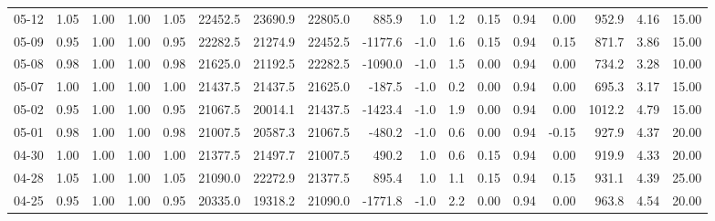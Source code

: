 \begin{threeparttable}
{\begin{tabular}{lrrrrrrrrrrrrrrrr}
  05-12 &         1.05 &           1.00 &          1.00 &          1.05 & 22452.5 & 23690.9 & 22805.0 &      885.9 &                      1.0 &                 1.2 &       0.15 &      0.94 &           0.00 &            952.9 &            4.16 &                  15.00 \\
  05-09 &         0.95 &           1.00 &          1.00 &          0.95 & 22282.5 & 21274.9 & 22452.5 &    -1177.6 &                     -1.0 &                 1.6 &       0.15 &      0.94 &           0.15 &            871.7 &            3.86 &                  15.00 \\
  05-08 &         0.98 &           1.00 &          1.00 &          0.98 & 21625.0 & 21192.5 & 22282.5 &    -1090.0 &                     -1.0 &                 1.5 &       0.00 &      0.94 &           0.00 &            734.2 &            3.28 &                  10.00 \\
  05-07 &         1.00 &           1.00 &          1.00 &          1.00 & 21437.5 & 21437.5 & 21625.0 &     -187.5 &                     -1.0 &                 0.2 &       0.00 &      0.94 &           0.00 &            695.3 &            3.17 &                  15.00 \\
  05-02 &         0.95 &           1.00 &          1.00 &          0.95 & 21067.5 & 20014.1 & 21437.5 &    -1423.4 &                     -1.0 &                 1.9 &       0.00 &      0.94 &           0.00 &           1012.2 &            4.79 &                  15.00 \\
  05-01 &         0.98 &           1.00 &          1.00 &          0.98 & 21007.5 & 20587.3 & 21067.5 &     -480.2 &                     -1.0 &                 0.6 &       0.00 &      0.94 &          -0.15 &            927.9 &            4.37 &                  20.00 \\
  04-30 &         1.00 &           1.00 &          1.00 &          1.00 & 21377.5 & 21497.7 & 21007.5 &      490.2 &                      1.0 &                 0.6 &       0.15 &      0.94 &           0.00 &            919.9 &            4.33 &                  20.00 \\
  04-28 &         1.05 &           1.00 &          1.00 &          1.05 & 21090.0 & 22272.9 & 21377.5 &      895.4 &                      1.0 &                 1.1 &       0.15 &      0.94 &           0.15 &            931.1 &            4.39 &                  25.00 \\
  04-25 &         0.95 &           1.00 &          1.00 &          0.95 & 20335.0 & 19318.2 & 21090.0 &    -1771.8 &                     -1.0 &                 2.2 &       0.00 &      0.94 &           0.00 &            963.8 &            4.54 &                  20.00 \\

\end{tabular}}
\end{threeparttable}
